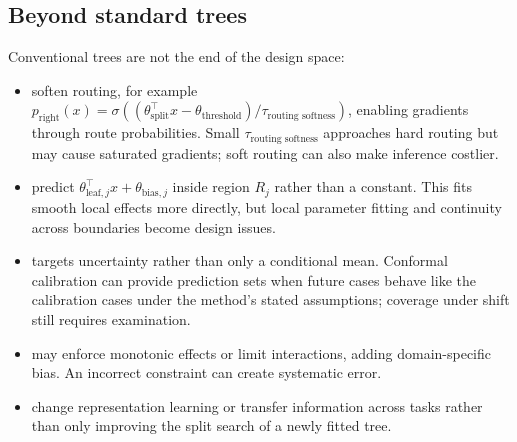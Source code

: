 \subsection{Beyond standard trees}
\label{subsec:trees-beyond-standard-trees}
Conventional trees are not the end of the design space:
\begin{itemize}
\item {} soften routing, for example $p_{\mathrm{right}}(x)=\sigma((\theta_{\text{split}}^\top x-\theta_{\text{threshold}})/\tau_{\text{routing softness}})$, enabling gradients through route probabilities.
Small $\tau_{\text{routing softness}}$ approaches hard routing but may cause saturated gradients; soft routing can also make inference costlier.
\item {} predict $\theta_{\text{leaf},j}^\top x+\theta_{\text{bias},j}$ inside region $R_j$ rather than a constant.
This fits smooth local effects more directly, but local parameter fitting and continuity across boundaries become design issues.
\item {} targets uncertainty rather than only a conditional mean.
Conformal calibration can provide prediction sets when future cases behave like the calibration cases under the method's stated assumptions; coverage under shift still requires examination.
\item {} may enforce monotonic effects or limit interactions, adding domain-specific bias.
An incorrect constraint can create systematic error.
\item {} change representation learning or transfer information across tasks rather than only improving the split search of a newly fitted tree.
\end{itemize}

